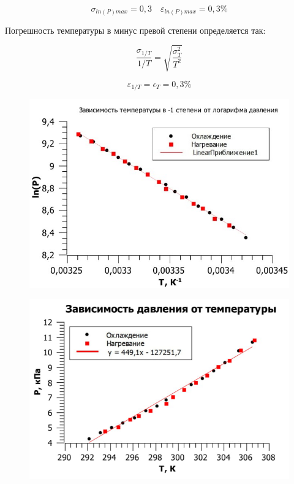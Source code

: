 \documentclass[12pt,a4paper]{article}
\begin{document}
\[\sigma_{ln(P)max} = 0,3 \quad \varepsilon_{ln(P)max} = 0,3\%\]

\vspace{0.5cm}

Погрешность температуры в минус превой степени определяется так:

\[\frac{\sigma_{1/T}}{1/T} = \sqrt{\frac{\sigma_T^2}{T^2}}\]

\[\varepsilon_{1/T} = \epsilon_T = 0,3\%\]
\vspace{0.5cm}

\begin{figure}[h!]
\centering
\includegraphics[scale=0.55] {ln(P)-1.jpg}
\label{fig:Image1}
\end{figure}

\vspace{0.5cm}

\begin{figure}[h!]
\centering
\includegraphics[scale=0.8]{P_V-1.png}
\label{fig:Image1}
\end{figure}
\vspace{0,5cm}
\end{document}
